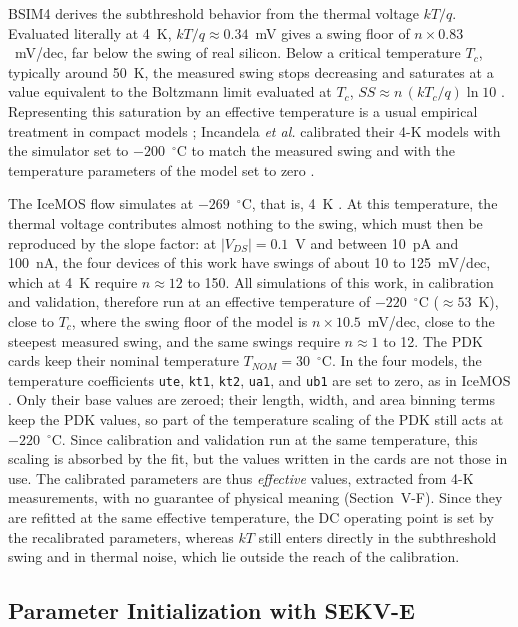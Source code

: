 \documentclass[a4paper,10pt,twoside,twocolumn,final]{JICS_LaTexGuidelines} %
\begin{document}
BSIM4 derives the subthreshold behavior from the thermal voltage $kT/q$. Evaluated literally at 4~K, $kT/q\approx0.34$~mV gives a swing floor of $n\times0.83$~mV/dec, far below the swing of real silicon. Below a critical temperature $T_c$, typically around 50~K, the measured swing stops decreasing and saturates at a value equivalent to the Boltzmann limit evaluated at $T_c$, $SS\approx n\,(kT_c/q)\ln 10$ \cite{b22}. Representing this saturation by an effective temperature is a usual empirical treatment in compact models \cite{b22}; Incandela \emph{et al.} calibrated their 4-K models with the simulator set to $-200$~$^\circ$C to match the measured swing and with the temperature parameters of the model set to zero \cite{b4}.

The IceMOS flow simulates at $-269$~$^\circ$C, that is, 4~K \cite{b5}. At this temperature, the thermal voltage contributes almost nothing to the swing, which must then be reproduced by the slope factor: at $|V_{DS}|=0.1$~V and between 10~pA and 100~nA, the four devices of this work have swings of about 10 to 125~mV/dec, which at 4~K require $n\approx12$ to 150. All simulations of this work, in calibration and validation, therefore run at an effective temperature of $-220$~$^\circ$C ($\approx53$~K), close to $T_c$, where the swing floor of the model is $n\times10.5$~mV/dec, close to the steepest measured swing, and the same swings require $n\approx1$ to 12. The PDK cards keep their nominal temperature $T_{NOM}=30$~$^\circ$C. In the four models, the temperature coefficients \texttt{ute}, \texttt{kt1}, \texttt{kt2}, \texttt{ua1}, and \texttt{ub1} are set to zero, as in IceMOS \cite{b6}. Only their base values are zeroed; their length, width, and area binning terms keep the PDK values, so part of the temperature scaling of the PDK still acts at $-220$~$^\circ$C. Since calibration and validation run at the same temperature, this scaling is absorbed by the fit, but the values written in the cards are not those in use. The calibrated parameters are thus \emph{effective} values, extracted from 4-K measurements, with no guarantee of physical meaning (Section~V-F). Since they are refitted at the same effective temperature, the DC operating point is set by the recalibrated parameters, whereas $kT$ still enters directly in the subthreshold swing and in thermal noise, which lie outside the reach of the calibration.

\subsection{Parameter Initialization with SEKV-E}
\end{document}
